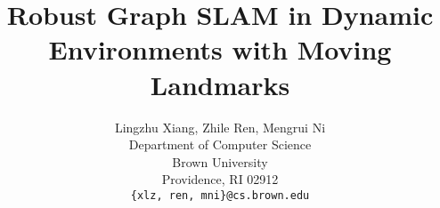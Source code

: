 \documentclass{article} %
\title{Robust Graph SLAM in Dynamic \\
Environments with Moving Landmarks}
\author{
Lingzhu Xiang, Zhile Ren, Mengrui Ni \\
Department of Computer Science\\
Brown University\\
Providence, RI 02912 \\
\texttt{\{xlz, ren, mni\}@cs.brown.edu} \\
}
\begin{document}
\maketitle













{}
\end{document}
